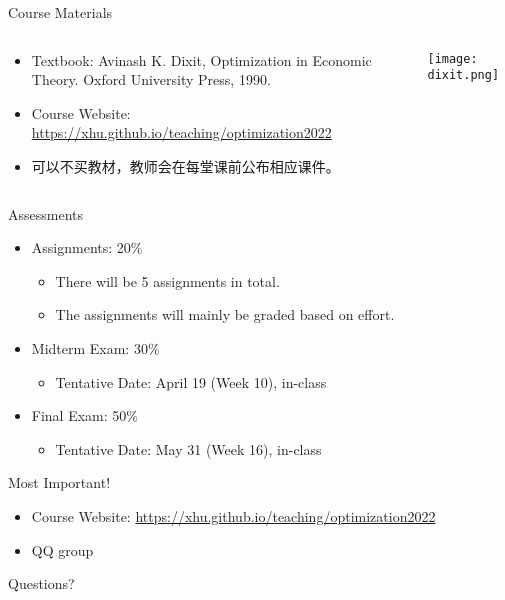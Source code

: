 \documentclass{beamer}
\begin{document}
\begin{frame}{Course Materials}
\begin{columns}
	\begin{column}{0.7\textwidth}
		\begin{itemize}
			\item Textbook: Avinash K. Dixit, Optimization in Economic Theory. Oxford University Press, 1990.		
			\item Course Website: \url{https://xhu.github.io/teaching/optimization2022}
			\item 可以不买教材，教师会在每堂课前公布相应课件。
		\end{itemize}
	\end{column}
	\begin{column}{0.3\textwidth}
		\begin{center}
			\texttt{[image: dixit.png]}      
		\end{center}
	\end{column}
\end{columns}
\end{frame}

\begin{frame}{Assessments}
	\begin{itemize}
	\item Assignments: 20\%
	\begin{itemize}
		\item There will be 5 assignments in total.
		\item The assignments will mainly be graded based on effort.
	\end{itemize}
	\item Midterm Exam: 30\% 
			\begin{itemize}
				\item Tentative Date: April 19 (Week 10), in-class
			\end{itemize}	
	\item Final Exam: 50\%
			\begin{itemize}
				\item Tentative Date: May 31 (Week 16), in-class
			\end{itemize}
\end{itemize}
\end{frame}

\begin{frame}{Most Important!}
\begin{itemize}
	\item Course Website: \url{https://xhu.github.io/teaching/optimization2022}
	\item QQ group
\end{itemize}


\end{frame}

\begin{frame}
\centering Questions?
\end{frame}
\end{document}
